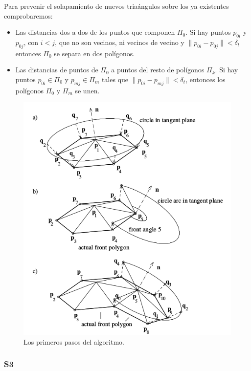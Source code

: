 Para prevenir el solapamiento de nuevos triaángulos sobre los ya existentes comprobaremos:

\begin{itemize}
\item Las distancias dos a dos de los puntos que componen $\Pi_0$. Si hay puntos $p_{0i}$ y $p_{0j}$, con $i<j$, que no son vecinos, ni vecinos de vecino y $\| p_{0i} - p_{0j} \| < \delta_t$ entonces $\Pi_0$ se separa en dos polígonos.
\item Las distancias de puntos de $\Pi_0$ a puntos del resto de polígonos $\Pi_k$. Si hay puntos $p_{0i} \in \Pi_0$ y $p_{mj} \in \Pi_m$ tales que $\| p_{0i} - p_{mj} \| < \delta_t$, entonces los polígonos $\Pi_0$ y $\Pi_m$ se unen.
\end{itemize}

\begin{figure}[h]
\centering
\includegraphics[scale=0.6]{images/hartmann3.png}
\caption{Los primeros pasos del algoritmo.}
\end{figure}

\subsubsection{S3}

